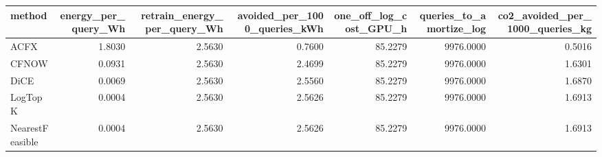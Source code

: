 \begin{tabular}{lrrrrrr}
\toprule
         method &  energy\_per\_query\_Wh &  retrain\_energy\_per\_query\_Wh &  avoided\_per\_1000\_queries\_kWh &  one\_off\_log\_cost\_GPU\_h &  queries\_to\_amortize\_log &  co2\_avoided\_per\_1000\_queries\_kg \\
\midrule
           ACFX &               1.8030 &                       2.5630 &                        0.7600 &                 85.2279 &                9976.0000 &                           0.5016 \\
          CFNOW &               0.0931 &                       2.5630 &                        2.4699 &                 85.2279 &                9976.0000 &                           1.6301 \\
           DiCE &               0.0069 &                       2.5630 &                        2.5560 &                 85.2279 &                9976.0000 &                           1.6870 \\
        LogTopK &               0.0004 &                       2.5630 &                        2.5626 &                 85.2279 &                9976.0000 &                           1.6913 \\
NearestFeasible &               0.0004 &                       2.5630 &                        2.5626 &                 85.2279 &                9976.0000 &                           1.6913 \\
\bottomrule
\end{tabular}
